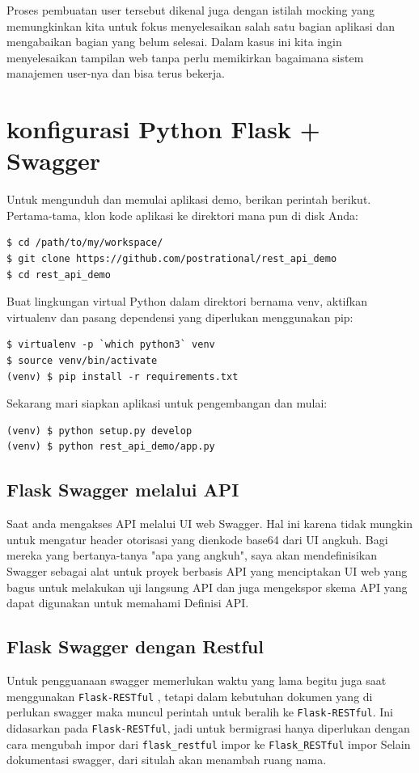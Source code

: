 Proses pembuatan user tersebut dikenal juga dengan istilah mocking yang memungkinkan kita untuk fokus menyelesaikan salah satu bagian aplikasi dan mengabaikan bagian yang belum selesai. Dalam kasus ini kita ingin menyelesaikan tampilan web tanpa perlu memikirkan bagaimana sistem manajemen user-nya dan bisa terus bekerja.




\section{konfigurasi Python Flask + Swagger}
Untuk mengunduh dan memulai aplikasi demo, berikan perintah berikut. Pertama-tama, klon kode aplikasi ke direktori mana pun di disk Anda:
\begin{verbatim}
$ cd /path/to/my/workspace/
$ git clone https://github.com/postrational/rest_api_demo
$ cd rest_api_demo
\end{verbatim}
Buat lingkungan virtual Python dalam direktori bernama venv, aktifkan virtualenv dan pasang dependensi yang diperlukan menggunakan pip:
\begin{verbatim}
$ virtualenv -p `which python3` venv
$ source venv/bin/activate
(venv) $ pip install -r requirements.txt
\end{verbatim}
Sekarang mari siapkan aplikasi untuk pengembangan dan mulai:
\begin{verbatim}
(venv) $ python setup.py develop
(venv) $ python rest_api_demo/app.py
\end{verbatim}
\cite{de2017api}

\subsection{Flask Swagger melalui API}
Saat anda mengakses API melalui UI web Swagger. Hal ini karena tidak mungkin untuk mengatur header otorisasi yang dienkode base64 dari UI angkuh. Bagi mereka yang bertanya-tanya "apa yang angkuh", saya akan mendefinisikan Swagger sebagai alat untuk proyek berbasis API yang menciptakan UI web yang bagus untuk melakukan uji langsung API dan juga mengekspor skema API yang dapat digunakan untuk memahami Definisi API.

\subsection{Flask Swagger dengan Restful}
Untuk pengguanaan swagger memerlukan waktu yang lama begitu juga saat menggunakan \verb|Flask-RESTful| , tetapi dalam kebutuhan dokumen yang di perlukan swagger maka muncul perintah untuk beralih ke \verb|Flask-RESTful|. Ini didasarkan pada \verb|Flask-RESTful|, jadi untuk bermigrasi hanya diperlukan dengan cara mengubah impor dari \verb|flask_restful|  impor ke \verb|Flask_RESTful| impor Selain dokumentasi swagger, dari situlah akan menambah ruang nama.


